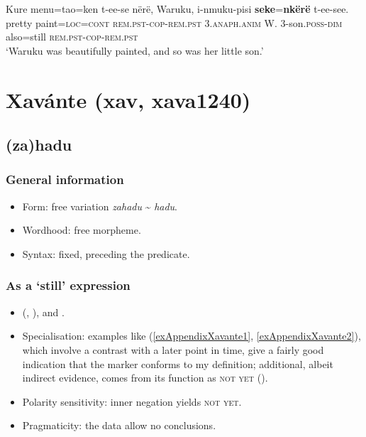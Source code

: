 \begin{exe}
	\ex\label{exAppendixTrioSekeNkere}
	\gll Kure	menu=tao=ken	t-ee-se			nërë,	Waruku,	i-nmuku-pisi
	\textbf{seke}=\textbf{nkërë} t-ee-see.\\
	pretty paint=\textsc{loc}=\textsc{cont} \textsc{rem}.\textsc{pst}-\textsc{cop}-\textsc{rem}.\textsc{pst} 3.\textsc{anaph}.\textsc{anim} W. 3-son.\textsc{poss}-\textsc{dim} also=still \textsc{rem}.\textsc{pst}-\textsc{cop}-\textsc{rem}.\textsc{pst}\\
	\glt \lq Waruku was beautifully painted, and so was her little son.\rq{ }\parencite[451]{Meira1999}	
\end{exe}

\section{Xavánte (xav, xava1240)}
\label{appendixXvante}
\subsection{(za)hadu}

\subsubsection{General information}
\begin{itemize}
	\item Form: free variation \textit{zahadu} \sim{ }\textit{hadu}.
	\item Wordhood: free morpheme.
	\item Syntax: fixed, preceding the predicate.
\end{itemize}

\subsubsection{As a \lq{}still\rq{ }expression}
\begin{itemize}
	\item \citeauthor{Lachnitt1987} (\citeyear[7]{Lachnitt1987}, \citeyear[167]{Lachnitt1988}), \textcite[107]{Estevam2011} and \textcite[123, 134]{McLeod2004}.
	\item Specialisation: examples like (\ref{exAppendixXavante1}, \ref{exAppendixXavante2}), which involve a contrast with a later point in time, give a fairly good indication that the marker conforms to my definition; additional, albeit indirect evidence, comes from its function as \textsc{not yet} ().
	\item Polarity sensitivity: inner negation yields \textsc{not yet}.
	\item Pragmaticity: the data allow no conclusions.
\end{itemize}

